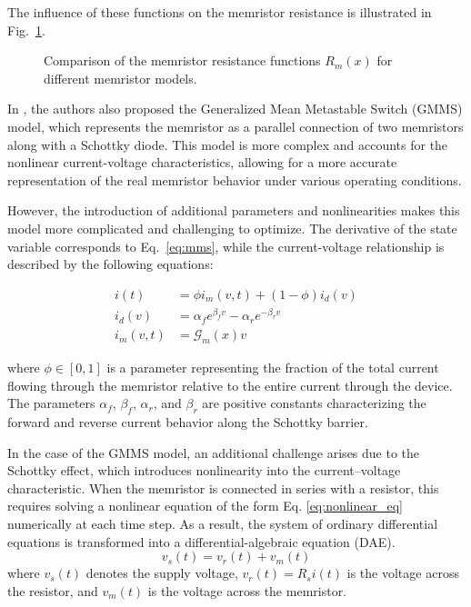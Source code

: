 \documentclass[11pt, oneside]{article}
\newcommand{\G}{\mathcal{G}}
\begin{document}
The influence of these functions on the memristor resistance is illustrated in Fig.~\ref{fig:m-x}.

\begin{figure}[H]
    \centering
    \resizebox{0.5\linewidth}{!}{%
        
    }
    \caption{Comparison of the memristor resistance functions $R_m(x)$ for different memristor models.}
    \label{fig:m-x}
\end{figure}

In \cite{Molter2016}, the authors also proposed the Generalized Mean Metastable Switch (GMMS) model, which represents the memristor as a parallel connection of two memristors along with a Schottky diode. This model is more complex and accounts for the nonlinear current-voltage characteristics, allowing for a more accurate representation of the real memristor behavior under various operating conditions.

However, the introduction of additional parameters and nonlinearities makes this model more complicated and challenging to optimize. The derivative of the state variable corresponds to Eq.~\eqref{eq:mms}, while the current-voltage relationship is described by the following equations:

\begin{align}
    i(t)      & = \phi i_m(v, t) + (1-\phi) i_d(v)                 \\
    i_d(v)    & = \alpha_f e^{\beta_f v} - \alpha_r e^{-\beta_r v} \\
    i_m(v, t) & = \G_m(x) v
    \label{eq:gmms}
\end{align}

where $\phi \in [0,1]$ is a parameter representing the fraction of the total current flowing through the memristor relative to the entire current through the device. The parameters $\alpha_f$, $\beta_f$, $\alpha_r$, and $\beta_r$ are positive constants characterizing the forward and reverse current behavior along the Schottky barrier.


In the case of the GMMS model, an additional challenge arises due to the Schottky effect, which introduces nonlinearity into the current–voltage characteristic. When the memristor is connected in series with a resistor, this requires solving a nonlinear equation of the form Eq. \eqref{eq:nonlinear_eq} numerically at each time step. As a result, the system of ordinary differential equations is transformed into a differential-algebraic equation (DAE).
\begin{equation}
    v_s(t) = v_r(t) + v_m(t)
    \label{eq:nonlinear_eq}
\end{equation}
where $v_s(t)$ denotes the supply voltage, $v_r(t) = R_s i(t)$ is the voltage across the resistor, and $v_m(t)$ is the voltage across the memristor.
\end{document}
